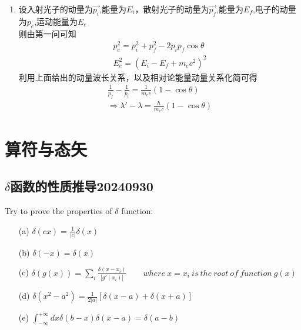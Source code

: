 \documentclass{article}
\begin{document}
\begin{enumerate}
    \item 设入射光子的动量为$\vec{p_i}$,能量为$E_i$，散射光子的动量为$\vec{p_f}$,能量为$E_f$,电子的动量为$p_e$,运动能量为$E_e$\\
          则由第一问可知
          \begin{align*}
              p_e^2 = p_i^2+p_f^2-2p_ip_f\cos\theta \\
              E_e^2 = (E_i-E_f+m_ec^2)^2
          \end{align*}
          利用上面给出的动量波长关系，以及相对论能量动量关系化简可得
          \begin{eqnarray*}
              \frac{1}{p_f}-\frac{1}{p_i}=\frac{1}{m_ec}(1-\cos\theta)\\
              \Rightarrow \lambda'-\lambda=\frac{h}{m_ec}(1-\cos\theta)
          \end{eqnarray*}
\end{enumerate}

\section{算符与态矢}
\subsection{$\delta$函数的性质推导20240930}
Try to prove the properties of $\delta$ function:
\begin{enumerate}
    \item[(a)] $\displaystyle\delta(cx)=\frac{1}{|c|}\delta(x)$
    \item[(b)] $\displaystyle\delta(-x)=\delta(x)$
    \item[(c)] $\displaystyle\delta(g(x))=\sum_{i}\frac{\delta(x-x_i)}{|g'(x_i)|}\quad\quad where\ x=x_i\ is\ the\ root\ of\ function\ g(x)$
    \item[(d)] $\displaystyle\delta(x^2-a^2)=\frac{1}{2|a|}\left[\delta(x-a)+\delta(x+a)\right]$
    \item[(e)] $\displaystyle\int_{-\infty}^{+\infty}dx\delta(b-x)\delta(x-a)=\delta(a-b)$
\end{enumerate}
\end{document}
